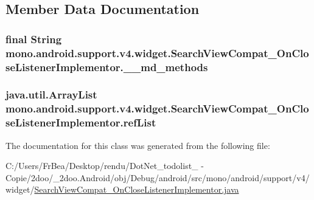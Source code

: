 \subsection{Member Data Documentation}
\hypertarget{classmono_1_1android_1_1support_1_1v4_1_1widget_1_1_search_view_compat___on_close_listener_implementor_89aae80e52a06e276333257f14abb6c3}{
\subsubsection[{\_\-\_\-md\_\-methods}]{\setlength{\rightskip}{0pt plus 5cm}final String {\bf mono.android.support.v4.widget.SearchViewCompat\_\-OnCloseListenerImplementor.\_\-\_\-md\_\-methods}}}
\label{classmono_1_1android_1_1support_1_1v4_1_1widget_1_1_search_view_compat___on_close_listener_implementor_89aae80e52a06e276333257f14abb6c3}


\hypertarget{classmono_1_1android_1_1support_1_1v4_1_1widget_1_1_search_view_compat___on_close_listener_implementor_a9871fadc765ef12272ab9dc2659565c}{
\subsubsection[{refList}]{\setlength{\rightskip}{0pt plus 5cm}java.util.ArrayList {\bf mono.android.support.v4.widget.SearchViewCompat\_\-OnCloseListenerImplementor.refList}}}
\label{classmono_1_1android_1_1support_1_1v4_1_1widget_1_1_search_view_compat___on_close_listener_implementor_a9871fadc765ef12272ab9dc2659565c}




The documentation for this class was generated from the following file:\begin{CompactItemize}
\item 
C:/Users/FrBea/Desktop/rendu/DotNet\_\-todolist\_ - Copie/2doo/\_\-2doo.Android/obj/Debug/android/src/mono/android/support/v4/widget/\hyperlink{_search_view_compat___on_close_listener_implementor_8java}{SearchViewCompat\_\-OnCloseListenerImplementor.java}\end{CompactItemize}
